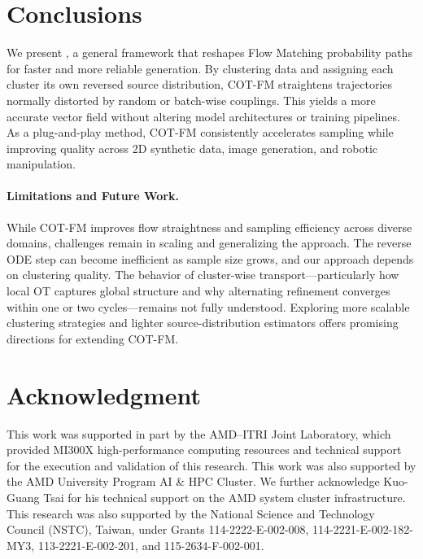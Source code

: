 \section{Conclusions}
We present \method{}, a general framework that reshapes Flow Matching probability paths for faster and more reliable generation. By clustering data and assigning each cluster its own reversed source distribution, COT-FM straightens trajectories normally distorted by random or batch-wise couplings. This yields a more accurate vector field without altering model architectures or training pipelines. As a plug-and-play method, COT-FM consistently accelerates sampling while improving quality across 2D synthetic data, image generation, and robotic manipulation.

\paragraph{Limitations and Future Work.}
While COT-FM improves flow straightness and sampling efficiency across diverse domains, challenges remain in scaling and generalizing the approach. The reverse ODE step can become inefficient as sample size grows, and our approach depends on clustering quality. The behavior of cluster-wise transport—particularly how local OT captures global structure and why alternating refinement converges within one or two cycles—remains not fully understood. Exploring more scalable clustering strategies and lighter source-distribution estimators offers promising directions for extending COT-FM.

\clearpage
{
    \small
    \section*{Acknowledgment}
        This work was supported in part by the AMD--ITRI Joint Laboratory, which provided MI300X high-performance computing resources and technical support for the execution and validation of this research. This work was also supported by the AMD University Program AI \& HPC Cluster. We further acknowledge Kuo-Guang Tsai for his technical support on the AMD system cluster infrastructure. This research was also supported by the National Science and Technology Council (NSTC), Taiwan, under Grants 114-2222-E-002-008, 114-2221-E-002-182-MY3, 113-2221-E-002-201, and 115-2634-F-002-001.
    
    
}


